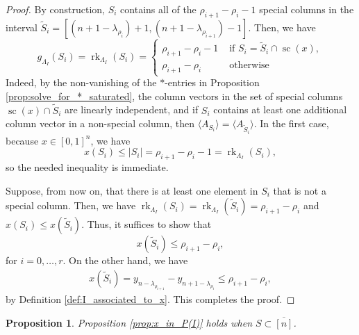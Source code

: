 \documentclass[12pt]{amsart}
\newtheorem{proposition}[definition]{Proposition}
\DeclareMathOperator{\rk}{rk}
\DeclareMathOperator{\SC}{sc}
\begin{document}
\begin{proof}
By construction, $S_i$ contains all of the $\rho_{i+1}-\rho_i-1$ special columns in the interval $\widetilde{S}_i=[(n+1-\lambda_{\rho_{i}})+1, (n+1-\lambda_{\rho_{i+1}})-1]$. Then, we have
\begin{equation*}
    g_{\Lambda_I}(S_i) = \rk_{\Lambda_I} (S_i) = 
    \begin{cases}
        \rho_{i+1}-\rho_i-1 &\text{ if } S_i = \widetilde{S}_i\cap \SC(x),\\
        \rho_{i+1}-\rho_i&\text{ otherwise}
    \end{cases}
\end{equation*}
Indeed, by the non-vanishing of the $*$-entries in Proposition \ref{prop:solve_for_*_saturated}, the column vectors in the set of special columns $\SC(x)\cap  \widetilde{S}_i$ are linearly independent, and if $S_i$ contains at least one additional column vector in a non-special column, then $\langle A_{S_i}\rangle=\langle A_{\widetilde{S}_i}\rangle$. In the first case, because $x\in[0,1]^n$, we have
\begin{equation*}
    x(S_i)\le |S_i|= \rho_{i+1}-\rho_i-1=\rk_{\Lambda_I} (S_i),
\end{equation*}
so the needed inequality is immediate.

Suppose, from now on, that there is at least one element in $S_i$ that is not a special column. Then, we have $\rk_{\Lambda_I}(S_i) = \rk_{\Lambda_I}(\widetilde{S}_i) = \rho_{i+1}-\rho_i$ and $x(S_i) \le x(\widetilde{S}_i)$. Thus, it suffices to show that 
\begin{equation*}
    x(\widetilde{S}_i) \le \rho_{i+1}-\rho_i,
\end{equation*}
for $i=0,\ldots,r$. On the other hand, we have
\begin{align*}
    x(\widetilde{S}_i)=y_{n-\lambda_{\rho_{i+1}}}-y_{n+1-\lambda_{\rho_i}}\le \rho_{i+1}-\rho_i,
\end{align*}
by Definition \ref{def:I_associated_to_x}. This completes the proof.
\end{proof}

\begin{proposition}\label{prop:S_ineq_negative}
    Proposition \ref{prop:x_in_P(I)} holds when $S\subset\overline{[n]}$.
\end{proposition}
\end{document}
